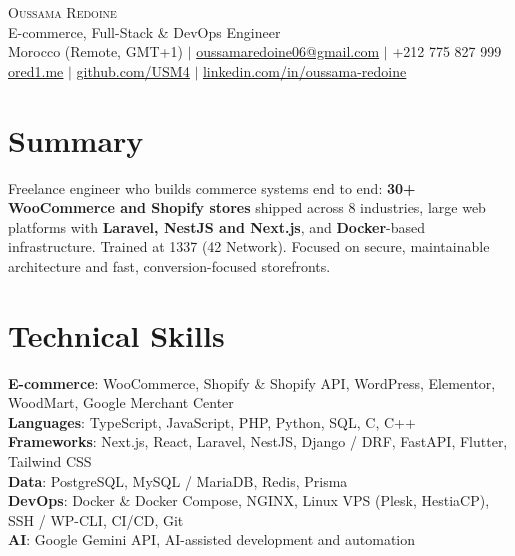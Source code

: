 \documentclass[letterpaper,10.5pt]{article}
\begin{document}
\begin{center}
  {\Huge \scshape Oussama Redoine} \\ \vspace{2pt}
  \large E-commerce, Full-Stack \& DevOps Engineer \\ \vspace{3pt}
  \small Morocco (Remote, GMT+1) $|$
  \href{mailto:oussamaredoine06@gmail.com}{oussamaredoine06@gmail.com} $|$
  +212 775 827 999 \\ \vspace{1pt}
  \href{https://ored1.me}{\underline{ored1.me}} $|$
  \href{https://github.com/USM4}{\underline{github.com/USM4}} $|$
  \href{https://www.linkedin.com/in/oussama-redoine-406828210}{\underline{linkedin.com/in/oussama-redoine}}
\end{center}

\section{Summary}
\small{Freelance engineer who builds commerce systems end to end: \textbf{30+ WooCommerce and Shopify stores} shipped across 8 industries,
large web platforms with \textbf{Laravel, NestJS and Next.js}, and \textbf{Docker}-based infrastructure. Trained at 1337 (42 Network).
Focused on secure, maintainable architecture and fast, conversion-focused storefronts.}

\section{Technical Skills}
\begin{itemize}[leftmargin=0.12in,label={}]
  \small{\item{
    \textbf{E-commerce}{: WooCommerce, Shopify \& Shopify API, WordPress, Elementor, WoodMart, Google Merchant Center} \\
    \textbf{Languages}{: TypeScript, JavaScript, PHP, Python, SQL, C, C++} \\
    \textbf{Frameworks}{: Next.js, React, Laravel, NestJS, Django / DRF, FastAPI, Flutter, Tailwind CSS} \\
    \textbf{Data}{: PostgreSQL, MySQL / MariaDB, Redis, Prisma} \\
    \textbf{DevOps}{: Docker \& Docker Compose, NGINX, Linux VPS (Plesk, HestiaCP), SSH / WP-CLI, CI/CD, Git} \\
    \textbf{AI}{: Google Gemini API, AI-assisted development and automation}
  }}
\end{itemize}\vspace{-6pt}
\end{document}
